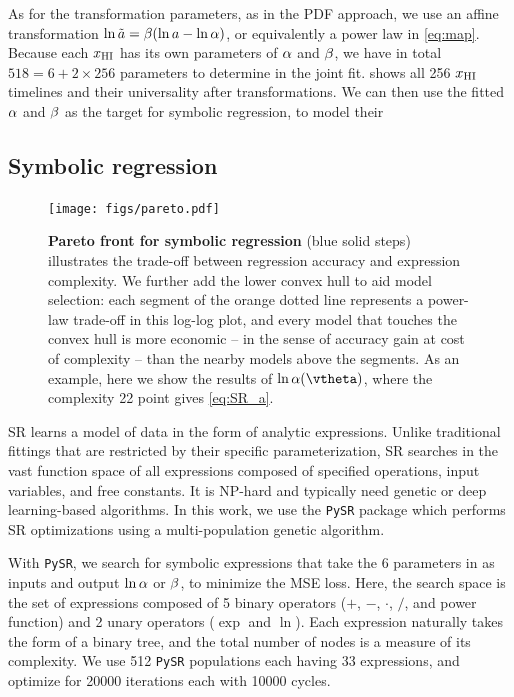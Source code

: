 As for the transformation parameters, as in the PDF approach, we use an
affine transformation $\ln\tilde{a} = \beta (\ln a - \ln\alpha)$, or equivalently
a power law in \cref{eq:map}.
Because each $x_{\mathrm{HI}}$ has its own parameters of $\alpha$ and $\beta$, we
have in total $518 = 6 + 2 \times 256$ parameters to determine in the
joint fit.
 shows all 256 $x_{\mathrm{HI}}$ timelines and their universality
after transformations.
We can then use the fitted $\alpha$ and $\beta$ as the target for symbolic
regression, to model their 


\subsection*{Symbolic regression}
\label{ssec:pysr}

\begin{figure}[tb]
\centering
\texttt{[image: figs/pareto.pdf]}
\caption{\textbf{Pareto front for symbolic regression} (blue solid
steps) illustrates the trade-off between regression accuracy and
expression complexity.
We further add the lower convex hull to aid model selection: each
segment of the orange dotted line represents a power-law trade-off in
this log-log plot, and every model that touches the convex hull is more
economic -- in the sense of accuracy gain at cost of complexity -- than
the nearby models above the segments.
As an example, here we show the results of $\ln\ap(\vtheta)$, where the
complexity 22 point gives \cref{eq:SR_a}.}
\label{fig:pareto}
\end{figure}

SR learns a model of data in the form of analytic expressions.
Unlike traditional fittings that are restricted by their specific
parameterization, SR searches in the vast function space of all
expressions composed of specified operations, input variables, and free
constants.
It is NP-hard \cite{SongEtAl2024, VirgolinPissis2022} and typically need
genetic or deep learning-based algorithms.
In this work, we use the \texttt{PySR} package \cite{Cranmer2020b,
Cranmer2023} which performs SR optimizations using a multi-population
genetic algorithm.

With \texttt{PySR}, we search for symbolic expressions that take the 6
parameters in  as inputs and output $\ln\alpha$ or $\beta$,
to minimize the MSE loss.
Here, the search space is the set of expressions composed of 5 binary
operators ($+$, $-$, $\cdot$, $/$, and power function) and 2 unary
operators ($\exp$ and $\ln$).
Each expression naturally takes the form of a binary tree, and the total
number of nodes is a measure of its complexity.
We use 512 \texttt{PySR} populations each having 33 expressions, and
optimize for 20000 iterations each with 10000 cycles.

